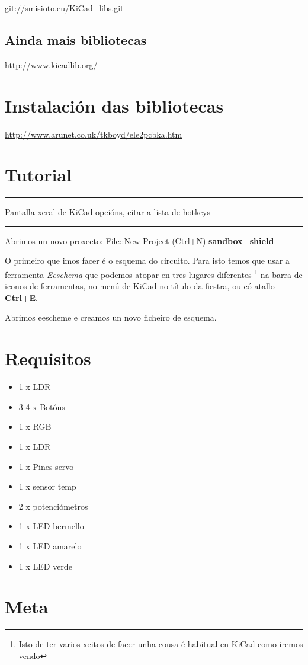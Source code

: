 \url{git://smisioto.eu/KiCad_libs.git}

\subsection{Ainda mais bibliotecas}\label{ainda-mais-bibliotecas}

\url{http://www.kicadlib.org/}

\section{Instalación das
bibliotecas}\label{instalaciuxf3n-das-bibliotecas}

\url{http://www.arunet.co.uk/tkboyd/ele2pcbka.htm}

\section{Tutorial}\label{tutorial}

\begin{center}\rule{0.5\linewidth}{\linethickness}\end{center}

Pantalla xeral de KiCad opcións, citar a lista de hotkeys

\begin{center}\rule{0.5\linewidth}{\linethickness}\end{center}

Abrimos un novo proxecto: File::New Project (Ctrl+N)
\textbf{sandbox\_shield}

O primeiro que imos facer é o esquema do circuito. Para isto temos que
usar a ferramenta \emph{Eeschema} que podemos atopar en tres lugares
diferentes \footnote{Isto de ter varios xeitos de facer unha cousa é
  habitual en KiCad como iremos vendo} na barra de iconos de
ferramentas, no menú de KiCad no título da fiestra, ou có atallo
\textbf{Ctrl+E}.

Abrimos eescheme e creamos un novo ficheiro de esquema.

\section{Requisitos}\label{requisitos}

\begin{itemize}
\itemsep1pt\parskip0pt
\item
  1 x LDR
\item
  3-4 x Botóns
\item
  1 x RGB
\item
  1 x LDR
\item
  1 x Pines servo
\item
  1 x sensor temp
\item
  2 x potenciómetros
\item
  1 x LED bermello
\item
  1 x LED amarelo
\item
  1 x LED verde
\end{itemize}

\section{Meta}\label{meta}
